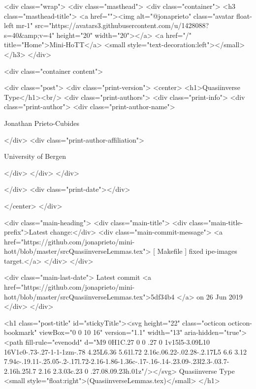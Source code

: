    <div class="wrap">
      <div class="masthead">
        <div class="container">
          <h3 class="masthead-title">
            <a href=""><img alt="@jonaprieto" class="avatar float-left mr-1" src="https://avatars3.githubusercontent.com/u/1428088?s=40&amp;v=4" height="20" width="20"></a>
            <a href="/" title="Home">Mini-HoTT</a>
            <small style="text-decoration:left"></small>
          </h3>
        </div>
      
      <div class="container content">
        







<div class="post">
  <div class="print-version">
    <center>
      <h1>Quasiinverse Type</h1><br/>
        <div class="print-authors">
          <div class="print-info">
            <div class="print-author">
              <div class="print-author-name">
                
                  Jonathan Prieto-Cubides
                
              </div>
              <div class="print-author-affiliation">
                
                  University of Bergen
                
                </div>
            </div>
          </div>
          
          
        </div>
        <div class="print-date"></div>
        
        
    </center>
  </div>

  
  <div class="main-heading">
    <div class="main-title">
      <div class="main-title-prefix">Latest change:</div>
      <div class="main-commit-message">
            <a href="https://github.com/jonaprieto/mini-hott/blob/master/srcQuasiinverseLemmas.tex">
              [ Makefile ] fixed ipe-images target.</a>
      </div>
    </div>

    <div class="main-last-date">
      Latest commit <a href="https://github.com/jonaprieto/mini-hott/blob/master/srcQuasiinverseLemmas.tex">5df34b4 </a> on  26 Jun 2019
    </div>
  </div>
  

  <h1 class="post-title" id="stickyTitle"><svg height="22" class="octicon octicon-bookmark" viewBox="0 0 10 16" version="1.1" width="13" aria-hidden="true"><path fill-rule="evenodd" d="M9 0H1C.27 0 0 .27 0 1v15l5-3.09L10 16V1c0-.73-.27-1-1-1zm-.78 4.25L6.36 5.61l.72 2.16c.06.22-.02.28-.2.17L5 6.6 3.12 7.94c-.19.11-.25.05-.2-.17l.72-2.16-1.86-1.36c-.17-.16-.14-.23.09-.23l2.3-.03.7-2.16h.25l.7 2.16 2.3.03c.23 0 .27.08.09.23h.01z"/></svg> Quasiinverse Type <small style="float:right">(QuasiinverseLemmas.tex)</small>
  </h1>

